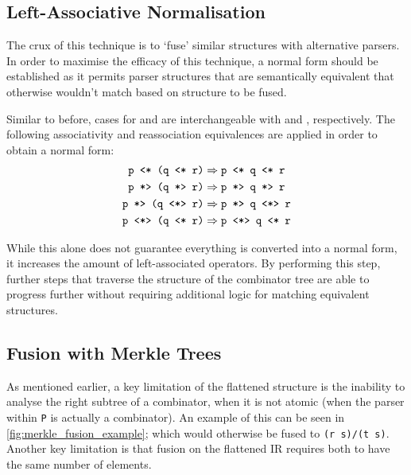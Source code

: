\subsection{Left-Associative Normalisation}
The crux of this technique is to `fuse' similar structures with alternative parsers.
In order to maximise the efficacy of this technique, a normal form should be established as it permits parser structures that are semantically equivalent that otherwise wouldn't match based on structure to be fused.

Similar to before, cases for \texttt{\multl} and \texttt{\multr} are interchangeable with \texttt{\apl} and \texttt{\apr}, respectively.
The following associativity and reassociation equivalences are applied in order to obtain a normal form:
\begin{align*}
    \texttt{p \apl (q \apl r)} & \Rightarrow \texttt{p \apl q \apl r} \\
    \texttt{p \apr (q \apr r)} & \Rightarrow \texttt{p \apr q \apr r} \\
    \texttt{p \apr (q \ap r)} & \Rightarrow \texttt{p \apr q \ap r} \\
    \texttt{p \ap (q \apl r)} & \Rightarrow \texttt{p \ap q \apl r}
\end{align*}

While this alone does not guarantee everything is converted into a normal form, it increases the amount of left-associated operators.
By performing this step, further steps that traverse the structure of the combinator tree are able to progress further without requiring additional logic for matching equivalent structures.

\subsection{Fusion with Merkle Trees}
As mentioned earlier, a key limitation of the flattened structure is the inability to analyse the right subtree of a combinator, when it is not atomic (when the parser within \texttt{P} is actually a combinator).
An example of this can be seen in \autoref{fig:merkle_fusion_example}; which would otherwise be fused to \texttt{(r \mult s)/(t \mult s)}.
Another key limitation is that fusion on the flattened IR requires both to have the same number of elements.

